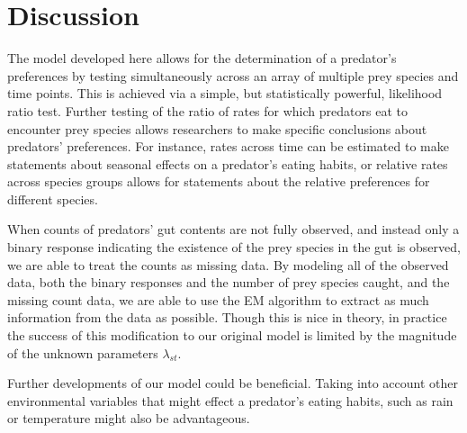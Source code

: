 \section{Discussion}
\label{sec:discussion}

The model developed here allows for the determination of a predator's preferences by testing simultaneously across an array of multiple prey species and time points.  This is achieved via a simple, but statistically powerful, likelihood ratio test.  Further testing of the ratio of rates for which predators eat to encounter prey species allows researchers to make specific conclusions about predators' preferences.  For instance, rates across time can be estimated to make statements about seasonal effects on a predator's eating habits, or relative rates across species groups allows for statements about the relative preferences for different species.

When counts of predators' gut contents are not fully observed, and instead only a binary response indicating the existence of the prey species in the gut is observed, we are able to treat the counts as missing data.  By modeling all of the observed data, both the binary responses and the number of prey species caught, and the missing count data, we are able to use the EM algorithm to extract as much information from the data as possible.  Though this is nice in theory, in practice the success of this modification to our original model is limited by the magnitude of the unknown parameters $\lambda_{st}$.  

Further developments of our model could be beneficial.  Taking into account other environmental variables that might effect a predator's eating habits, such as rain or temperature might also be advantageous.  

